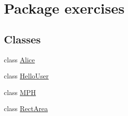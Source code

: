 \hypertarget{namespaceexercises}{}\section{Package exercises}
\label{namespaceexercises}
\subsection*{Classes}
\begin{DoxyCompactItemize}
\item 
class \mbox{\hyperlink{classexercises_1_1_alice}{Alice}}
\item 
class \mbox{\hyperlink{classexercises_1_1_hello_user}{Hello\+User}}
\item 
class \mbox{\hyperlink{classexercises_1_1_m_p_h}{M\+PH}}
\item 
class \mbox{\hyperlink{classexercises_1_1_rect_area}{Rect\+Area}}
\end{DoxyCompactItemize}
